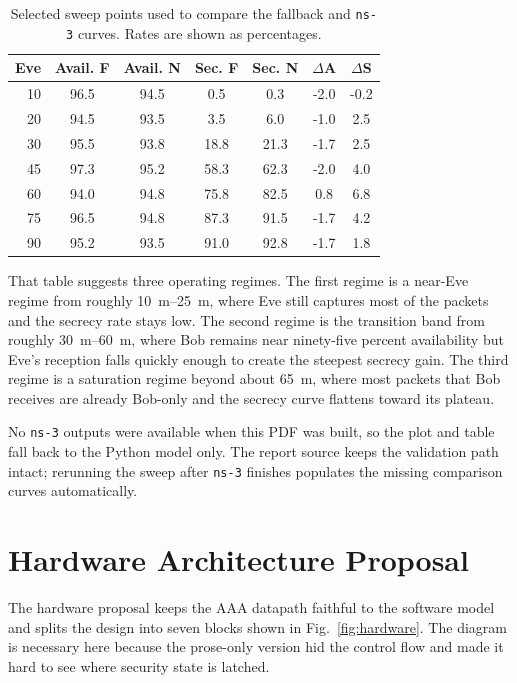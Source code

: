 \documentclass[11pt]{article}
\newif\ifhasnsthree
\newcommand{\MaxAvailabilityDeltaPct}{0.0}
\newcommand{\MaxSecrecyDeltaPct}{0.0}
\begin{document}
\begin{table}[t]
\centering
\caption{Selected sweep points used to compare the fallback and \texttt{ns-3} curves. Rates are shown as percentages.}
\begin{tabular}{rcccccc}
\toprule
Eve & Avail. F & Avail. N & Sec. F & Sec. N & $\Delta$A & $\Delta$S \\
\midrule
10 & 96.5 & 94.5 & 0.5 & 0.3 & -2.0 & -0.2 \\
20 & 94.5 & 93.5 & 3.5 & 6.0 & -1.0 & 2.5 \\
30 & 95.5 & 93.8 & 18.8 & 21.3 & -1.7 & 2.5 \\
45 & 97.3 & 95.2 & 58.3 & 62.3 & -2.0 & 4.0 \\
60 & 94.0 & 94.8 & 75.8 & 82.5 & 0.8 & 6.8 \\
75 & 96.5 & 94.8 & 87.3 & 91.5 & -1.7 & 4.2 \\
90 & 95.2 & 93.5 & 91.0 & 92.8 & -1.7 & 1.8 \\
\bottomrule
\end{tabular}
\end{table}

That table suggests three operating regimes. The first regime is a near-Eve regime from roughly \SIrange{10}{25}{m}, where Eve still captures most of the packets and the secrecy rate stays low. The second regime is the transition band from roughly \SIrange{30}{60}{m}, where Bob remains near ninety-five percent availability but Eve's reception falls quickly enough to create the steepest secrecy gain. The third regime is a saturation regime beyond about \SI{65}{m}, where most packets that Bob receives are already Bob-only and the secrecy curve flattens toward its plateau.

\ifhasnsthree
The fallback model was retained only as a surrogate, so the comparison against \texttt{ns-3} matters. Across the overlapping sweep points, the maximum absolute gap is \MaxAvailabilityDeltaPct\% in availability and \MaxSecrecyDeltaPct\% in secrecy rate. That is close enough for the fallback to remain useful for quick parameter sweeps and report drafting, but the \texttt{ns-3} curve should be treated as the authoritative result whenever the full simulator is available.
\else
No \texttt{ns-3} outputs were available when this PDF was built, so the plot and table fall back to the Python model only. The report source keeps the validation path intact; rerunning the sweep after \texttt{ns-3} finishes populates the missing comparison curves automatically.
\fi

\section{Hardware Architecture Proposal}
The hardware proposal keeps the AAA datapath faithful to the software model and splits the design into seven blocks shown in Fig.~\ref{fig:hardware}. The diagram is necessary here because the prose-only version hid the control flow and made it hard to see where security state is latched.
\end{document}
